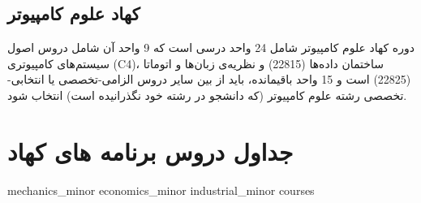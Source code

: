 \documentclass{article}
\begin{document}
\subsection{
کهاد علوم کامپیوتر
}
دوره کهاد علوم کامپیوتر شامل 24 واحد درسی است که 9 واحد آن شامل دروس اصول سیستم‌های کامپیوتری  (C4)، ساختمان داده‌ها (22815) و نظریه‌ی زبان‌ها و اتوماتا (22825) است و 15 واحد باقیمانده، باید از بین سایر دروس الزامی-تخصصی یا انتخابی-تخصصی رشته علوم کامپیوتر (که دانشجو در رشته خود نگذرانیده است) انتخاب شود.

\pagebreak
\section{جداول دروس برنامه های کهاد}

{mechanics_minor}
{economics_minor}
{industrial_minor}
{courses}
 
\end{document}
